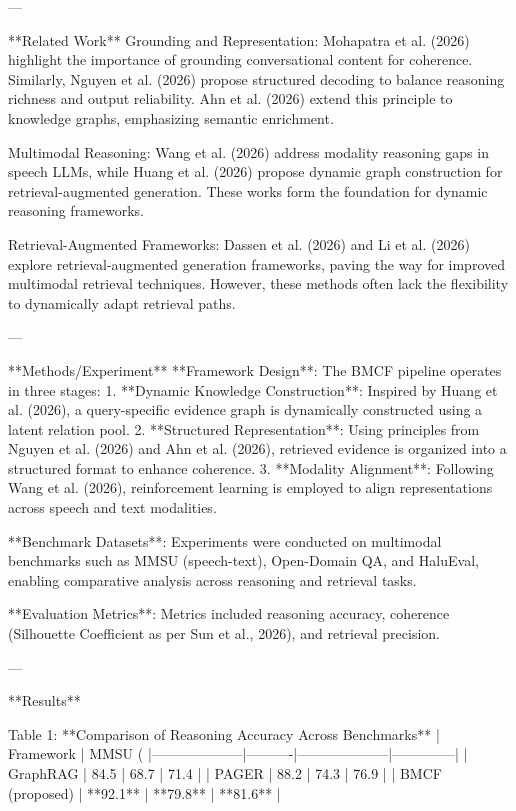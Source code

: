 ---

**Related Work**  
Grounding and Representation: Mohapatra et al. (2026) highlight the importance of grounding conversational content for coherence. Similarly, Nguyen et al. (2026) propose structured decoding to balance reasoning richness and output reliability. Ahn et al. (2026) extend this principle to knowledge graphs, emphasizing semantic enrichment.  

Multimodal Reasoning: Wang et al. (2026) address modality reasoning gaps in speech LLMs, while Huang et al. (2026) propose dynamic graph construction for retrieval-augmented generation. These works form the foundation for dynamic reasoning frameworks.  

Retrieval-Augmented Frameworks: Dassen et al. (2026) and Li et al. (2026) explore retrieval-augmented generation frameworks, paving the way for improved multimodal retrieval techniques. However, these methods often lack the flexibility to dynamically adapt retrieval paths.  

---

**Methods/Experiment**  
**Framework Design**: The BMCF pipeline operates in three stages:  
1. **Dynamic Knowledge Construction**: Inspired by Huang et al. (2026), a query-specific evidence graph is dynamically constructed using a latent relation pool.  
2. **Structured Representation**: Using principles from Nguyen et al. (2026) and Ahn et al. (2026), retrieved evidence is organized into a structured format to enhance coherence.  
3. **Modality Alignment**: Following Wang et al. (2026), reinforcement learning is employed to align representations across speech and text modalities.  

**Benchmark Datasets**: Experiments were conducted on multimodal benchmarks such as MMSU (speech-text), Open-Domain QA, and HaluEval, enabling comparative analysis across reasoning and retrieval tasks.  

**Evaluation Metrics**: Metrics included reasoning accuracy, coherence (Silhouette Coefficient as per Sun et al., 2026), and retrieval precision.  

---

**Results**

Table 1: **Comparison of Reasoning Accuracy Across Benchmarks**  
| Framework         | MMSU (%
|--------------------|----------|--------------------|--------------|
| GraphRAG          | 84.5     | 68.7               | 71.4         |
| PAGER             | 88.2     | 74.3               | 76.9         |
| BMCF (proposed)   | **92.1** | **79.8**           | **81.6**     |

